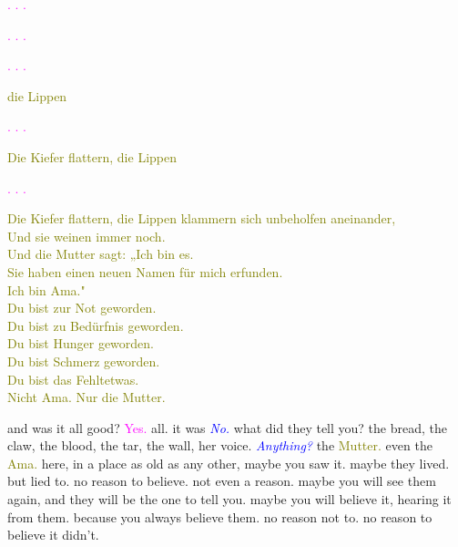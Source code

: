 \documentclass[11pt]{article}
\begin{document}
\begingroup
\begin{center}
\textcolor{magenta}{. . .} 
\end{center}
\endgroup

\begingroup
\begin{center}
\textcolor{magenta}{. . .} 
\end{center}
\endgroup

\begingroup
\begin{center}
\textcolor{magenta}{. . .} 
\end{center}
\endgroup

\begingroup
\begin{center}
\textcolor{olive}{die Lippen} 
\end{center}
\endgroup

\begingroup
\begin{center}
\textcolor{magenta}{. . .} 
\end{center}
\endgroup

\begingroup
\begin{center}
\textcolor{olive}{Die Kiefer flattern, die Lippen}
\end{center}
\endgroup

\begingroup
\begin{center}
\textcolor{magenta}{. . .} 
\end{center}
\endgroup

\begingroup
\begin{center}
\textcolor{olive}{Die Kiefer flattern, die Lippen klammern sich unbeholfen aneinander, \\ Und sie weinen immer noch. \\ Und die Mutter sagt: „Ich bin es. \\ Sie haben einen neuen Namen für mich erfunden. \\ Ich bin Ama." \\ Du bist zur Not geworden. \\ Du bist zu Bedürfnis geworden. \\ Du bist Hunger geworden. \\ Du bist Schmerz geworden. \\ Du bist das Fehltetwas. \\ Nicht Ama. Nur die Mutter. } 
\end{center}
\endgroup

\begingroup
and was it all good? \textcolor{magenta}{Yes.} all. it was \textit{\textcolor{blue}{No.}} what did they tell you? the bread, the claw, the blood, the tar, the wall, her voice. \textit{\textcolor{blue}{Anything?}} the \textcolor{olive}{Mutter.} even the \textcolor{olive}{Ama.} here, in a place as old as any other, maybe you saw it. maybe they lived. but lied to. no reason to believe. not even a reason. maybe you will see them again, and they will be the one to tell you. maybe you will believe it, hearing it from them. because you always believe them. no reason not to. no reason to believe it didn't. 
\endgroup
\end{document}
